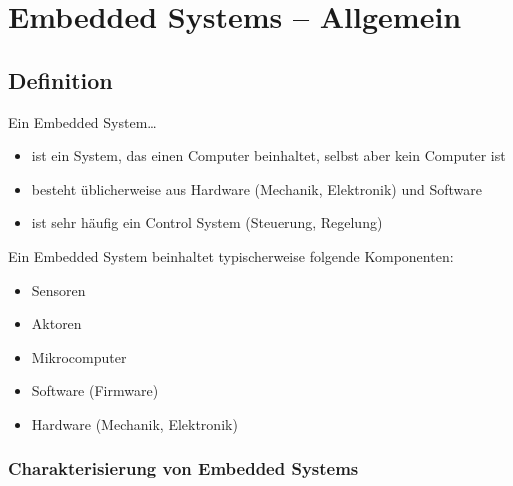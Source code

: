 \section{Embedded Systems -- Allgemein}
\subsection{Definition}

Ein Embedded System\ldots

\begin{itemize}
    \item ist ein System, das einen Computer beinhaltet, selbst aber kein Computer ist
    \item besteht üblicherweise aus Hardware (Mechanik, Elektronik) und Software
    \item ist sehr häufig ein Control System (Steuerung, Regelung)
\end{itemize}

\vspace{0.2cm}

Ein Embedded System beinhaltet typischerweise folgende Komponenten:

\begin{minipage}[t]{0.15\columnwidth}
    \begin{itemize}
        \item Sensoren
        \item Aktoren
    \end{itemize}
\end{minipage}
\hfill
\begin{minipage}[t]{0.3\columnwidth}
    \begin{itemize}
        \item Mikrocomputer
        \item Software (Firmware)
    \end{itemize}
\end{minipage}
\hfill
\begin{minipage}[t]{0.45\columnwidth}
    \begin{itemize}
        \item Hardware (Mechanik, Elektronik)
    \end{itemize}
\end{minipage}


\subsubsection{Charakterisierung von Embedded Systems}

